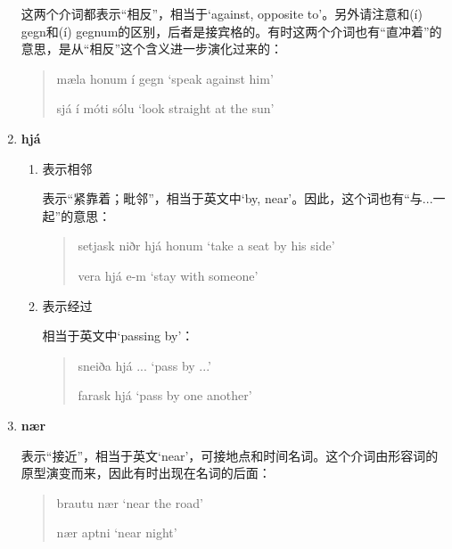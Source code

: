 \begin{enumerate}[itemindent=1em, label=\textbf{\arabic*}.]
          这两个介词都表示“相反”，相当于`against, opposite to'。另外请注意和(í) gegn和(í) gegnum的区别，后者是接宾格的。有时这两个介词也有“直冲着”的意思，是从“相反”这个含义进一步演化过来的：
          \begin{quote}
              mæla honum í gegn `speak against him'

              sjá í móti sólu `look straight at the sun'
          \end{quote}

    \item  \textbf{hjá}
          \begin{enumerate}
              \item 表示相邻

                    表示“紧靠着；毗邻”，相当于英文中`by, near'。因此，这个词也有“与...一起”的意思：
                    \begin{quote}
                        setjask niðr hjá honum `take a seat by his side'

                        vera hjá e-m `stay with someone'
                    \end{quote}

              \item 表示经过

                    相当于英文中`passing by'：
                    \begin{quote}
                        sneiða hjá ... `pass by ...'

                        farask hjá `pass by one another'
                    \end{quote}
          \end{enumerate}

    \item \textbf{nær}

          表示“接近”，相当于英文`near'，可接地点和时间名词。这个介词由形容词的原型演变而来，因此有时出现在名词的后面：
          \begin{quote}
              brautu nær `near the road'

              nær aptni `near night'
          \end{quote}
\end{enumerate}
